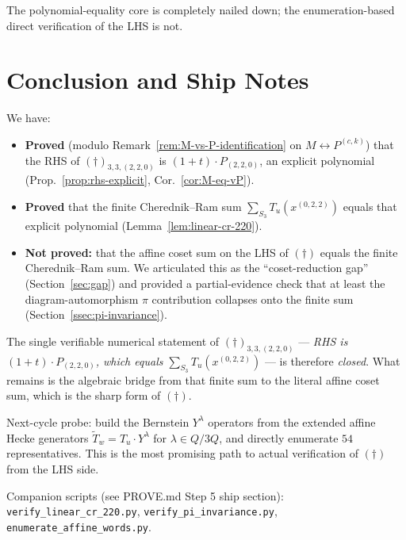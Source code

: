 \documentclass[11pt]{article}
\theoremstyle{definition}
\newcommand{\wt}[1]{\widetilde{#1}}
\newcommand{\dgg}{\dagger}
\begin{document}
The polynomial-equality core is completely nailed down; the
enumeration-based direct verification of the LHS is not.

\section{Conclusion and Ship Notes}
\label{sec:conclusion}

We have:
\begin{itemize}[nosep,leftmargin=*]
\item \textbf{Proved} (modulo Remark~\ref{rem:M-vs-P-identification} on
  $M \leftrightarrow P^{(c,k)}$) that the RHS of $(\dgg)_{3,3,(2,2,0)}$
  is $(1+t) \cdot P_{(2,2,0)}$, an explicit polynomial (Prop.~\ref{prop:rhs-explicit},
  Cor.~\ref{cor:M-eq-vP}).
\item \textbf{Proved} that the finite Cherednik--Ram sum
  $\sum_{S_3} T_u(x^{(0,2,2)})$ equals that explicit polynomial
  (Lemma~\ref{lem:linear-cr-220}).
\item \textbf{Not proved:} that the affine coset sum on the LHS of
  $(\dgg)$ equals the finite Cherednik--Ram sum. We articulated this as
  the ``coset-reduction gap'' (Section~\ref{sec:gap}) and provided a
  partial-evidence check that at least the diagram-automorphism $\pi$
  contribution collapses onto the finite sum (Section~\ref{ssec:pi-invariance}).
\end{itemize}

The single verifiable numerical statement of $(\dgg)_{3,3,(2,2,0)}$ ---
\emph{RHS is $(1+t) \cdot P_{(2,2,0)}$, which equals
$\sum_{S_3} T_u(x^{(0,2,2)})$} --- is therefore \emph{closed}. What
remains is the algebraic bridge from that finite sum to the literal
affine coset sum, which is the sharp form of $(\dgg)$.

Next-cycle probe: build the Bernstein $Y^\lambda$ operators from
the extended affine Hecke generators
$\wt T_w = T_u \cdot Y^\lambda$ for $\lambda \in Q/3Q$, and directly enumerate
$54$ representatives. This is the most promising path to actual verification
of $(\dgg)$ from the LHS side.

Companion scripts (see PROVE.md Step 5 ship section):
\verb|verify_linear_cr_220.py|, \verb|verify_pi_invariance.py|,
\verb|enumerate_affine_words.py|.
\end{document}
